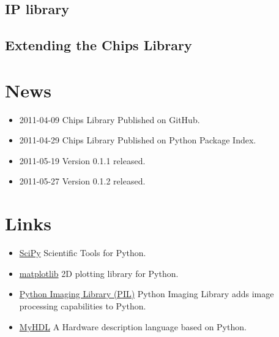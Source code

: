 \documentclass[letterpaper,10pt,english]{sphinxmanual}
\begin{document}
\section{IP library}
\label{ip_library/index:module-chips.ip}\label{ip_library/index::doc}\label{ip_library/index:ip-library}

\section{Extending the Chips Library}
\label{extending_chips/index:extending-the-chips-library}\label{extending_chips/index::doc}

\chapter{News}
\label{index:news}\begin{itemize}
\item {} 
2011-04-09 Chips Library Published on GitHub.

\item {} 
2011-04-29 Chips Library Published on Python Package Index.

\item {} 
2011-05-19 Version 0.1.1 released.

\item {} 
2011-05-27 Version 0.1.2 released.

\end{itemize}


\chapter{Links}
\label{index:links}\begin{itemize}
\item {} 
\href{http://scipy.org}{SciPy} Scientific Tools for Python.

\item {} 
\href{http://matplotlib.sourceforge.net}{matplotlib} 2D plotting library for Python.

\item {} 
\href{http://www.pythonware.com/products/pil/}{Python Imaging Library (PIL)} Python Imaging Library adds image processing
capabilities to Python.

\item {} 
\href{http://www.myhdl.org}{MyHDL} A Hardware description language based on Python.

\end{itemize}
\end{document}
